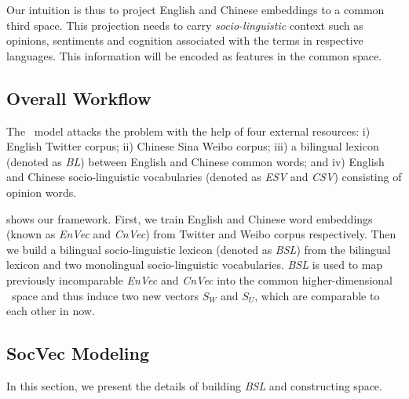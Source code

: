 Our intuition is thus to project English and Chinese embeddings to a common third space. This projection needs to carry 
\emph{socio-linguistic} context such as opinions, sentiments and cognition associated with
the terms in respective languages. This information will be encoded as features in
the common space.
%

\subsection{Overall Workflow}
The \textit{\socvec}~model attacks the problem with the help of four external resources: 
i) English Twitter corpus; ii) Chinese Sina Weibo corpus; iii) a bilingual lexicon (denoted as \textit{BL}) between 
 English and Chinese common words; and 
iv) English and Chinese socio-linguistic vocabularies (denoted as \textit{ESV} and \textit{CSV}) consisting of opinion words. 

 shows our framework. First, we train English and 
Chinese word embeddings (known as \textit{EnVec} and \textit{CnVec}) 
from Twitter and Weibo corpus respectively. Then 
we build a bilingual socio-linguistic lexicon (denoted as \textit{BSL}) 
from the bilingual lexicon and
two monolingual socio-linguistic vocabularies. \textit{BSL} is used to map previously incomparable \textit{EnVec} and \textit{CnVec} 
into the common higher-dimensional \textit{\socvec~}space and thus induce two new vectors $S_W$ and $S_U$, 
which are comparable to each other in \textit{\socvec} now. 

\subsection{SocVec Modeling}
\label{sec:model}
In this section, we present the details of building \textit{BSL} and constructing
\textit{\socvec} space.

